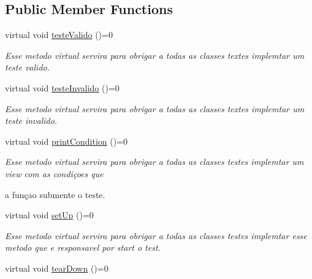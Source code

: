 \subsection*{Public Member Functions}
\begin{DoxyCompactItemize}
\item 
\hypertarget{class_teste_basico_a8835dd2bdebb7eaddfab920ba4a38d90}{virtual void \hyperlink{class_teste_basico_a8835dd2bdebb7eaddfab920ba4a38d90}{teste\-Valido} ()=0}\label{class_teste_basico_a8835dd2bdebb7eaddfab920ba4a38d90}

\begin{DoxyCompactList}\small\item\em Esse metodo virtual servira para obrigar a todas as classes textes implemtar um teste valido. \end{DoxyCompactList}\item 
virtual void \hyperlink{class_teste_basico_ab092e20a2d01f8cd1b969a31cc6172b9}{teste\-Invalido} ()=0
\begin{DoxyCompactList}\small\item\em Esse metodo virtual servira para obrigar a todas as classes textes implemtar um teste invalido. \end{DoxyCompactList}\item 
\hypertarget{class_teste_basico_aa56fe86bc659df9e481b9bfca245c46d}{virtual void \hyperlink{class_teste_basico_aa56fe86bc659df9e481b9bfca245c46d}{print\-Condition} ()=0}\label{class_teste_basico_aa56fe86bc659df9e481b9bfca245c46d}

\begin{DoxyCompactList}\small\item\em Esse metodo virtual servira para obrigar a todas as classes testes implemtar um view com as condiçoes que\par
 a funçao submente o teste. \end{DoxyCompactList}\item 
\hypertarget{class_teste_basico_a9801730ac8a0acc39a901a179aa91e97}{virtual void \hyperlink{class_teste_basico_a9801730ac8a0acc39a901a179aa91e97}{set\-Up} ()=0}\label{class_teste_basico_a9801730ac8a0acc39a901a179aa91e97}

\begin{DoxyCompactList}\small\item\em Esse metodo virtual servira para obrigar a todas as classes testes implemtar esse metodo que e responsavel por start o test. \end{DoxyCompactList}\item 
\hypertarget{class_teste_basico_a07d188571cde1351aa016de6ec4679c0}{virtual void \hyperlink{class_teste_basico_a07d188571cde1351aa016de6ec4679c0}{tear\-Down} ()=0}\label{class_teste_basico_a07d188571cde1351aa016de6ec4679c0}


\end{DoxyCompactItemize}
